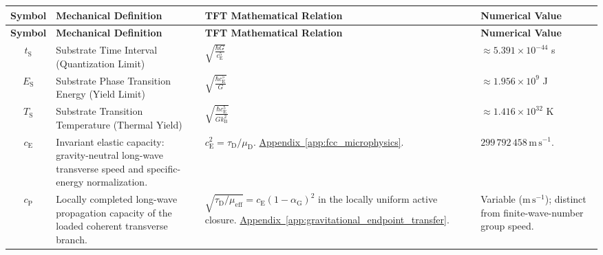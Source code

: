\vspace{0.5cm}
\noindent
\renewcommand{\arraystretch}{1.6}
\begin{longtable}{@{} c p{5.5cm} p{4cm} p{3.5cm} @{}}
\toprule
\textbf{Symbol} & \textbf{Mechanical Definition} & \textbf{TFT Mathematical Relation} & \textbf{Numerical Value} \\
\midrule
\endfirsthead

\toprule
\textbf{Symbol} & \textbf{Mechanical Definition} & \textbf{TFT Mathematical Relation} & \textbf{Numerical Value} \\
\midrule
\endhead

$t_{\mathrm{S}}$ & Substrate Time Interval (Quantization Limit) & $\sqrt{\frac{\hbar G}{c_{\mathrm{E}}^5}}$ & $\approx 5.391 \times 10^{-44}$ s \\

$E_{\mathrm{S}}$ & Substrate Phase Transition Energy (Yield Limit) & $\sqrt{\frac{\hbar c_{\mathrm{E}}^5}{G}}$ & $\approx 1.956 \times 10^9$ J \\

$T_{\mathrm{S}}$ & Substrate Transition Temperature (Thermal Yield) & $\sqrt{\frac{\hbar c_{\mathrm{E}}^5}{G k_{\mathrm{B}}^2}}$ & $\approx 1.416 \times 10^{32}$ K \\

$c_{\mathrm E}$ & {\raggedright Invariant elastic capacity: gravity-neutral long-wave transverse speed and specific-energy normalization.\par} & {\raggedright $c_{\mathrm E}^2=\tau_{\mathrm D}/\mu_{\mathrm D}$. \newline \hyperref[app:fcc_microphysics]{Appendix~\ref*{app:fcc_microphysics}}.\par} & {\raggedright $299\,792\,458\,\mathrm{m\,s^{-1}}$.\par} \\

$c_{\mathrm P}$ & {\raggedright Locally completed long-wave propagation capacity of the loaded coherent transverse branch.\par} & {\raggedright $\sqrt{\tau_{\mathrm D}/\mu_{\mathrm{eff}}}=c_{\mathrm E}(1-\alpha_{\mathrm G})^2$ in the locally uniform active closure. \newline \hyperref[app:gravitational_endpoint_transfer]{Appendix~\ref*{app:gravitational_endpoint_transfer}}.\par} & {\raggedright Variable ($\mathrm{m\,s^{-1}}$); distinct from finite-wave-number group speed.\par} \\


\end{longtable}

